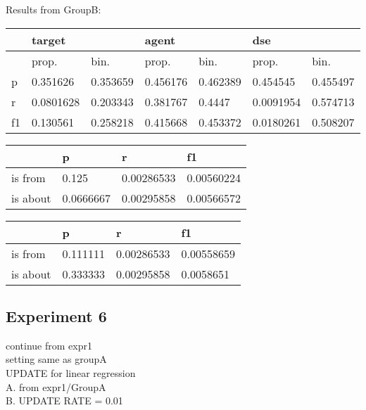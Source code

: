 \documentclass[a4paper, 12pt]{article}
\begin{document}
Results from GroupB:\\
\begin{table}[h!]
\centering
{}

\begin{tabular}{l|ll|ll|ll}
\hline
   & \multicolumn{2}{l}{target} & \multicolumn{2}{l}{agent} & \multicolumn{2}{l}{dse} \\ \hline
   & prop.& bin.& prop.& bin.& prop.& bin.\\
 \hline
p  & 0.351626&0.353659& 0.456176 & 0.462389& 0.454545  & 0.455497  \\
r  &0.0801628&0.203343& 0.381767 &   0.4447&0.0091954  & 0.574713  \\
f1 & 0.130561&0.258218& 0.415668 & 0.453372&0.0180261  & 0.508207  \\ \hline
\end{tabular}
\centering
{}

\begin{tabular}{l|l|l|l}
\hline
         & p & r & f1    \\\hline
is from  & 0.125& 0.00286533& 0.00560224\\
is about &0.0666667& 0.00295858& 0.00566572\\
\hline
\end{tabular}
\centering
{}

\begin{tabular}{l|l|l|l}
\hline
         & p & r & f1    \\\hline
is from  & 0.111111& 0.00286533& 0.00558659\\
is about &0.333333& 0.00295858&  0.0058651\\
\hline
\end{tabular}
\end{table}

\subsection{Experiment 6}
continue from expr1\\
setting same as groupA\\
UPDATE for linear regression\\
A. from expr1/GroupA\\
B. UPDATE RATE = 0.01\\
\end{document}
